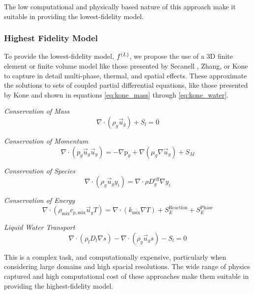 The low computational and physically based nature of this approach make it suitable in providing the lowest-fidelity model.

\subsubsection{Highest Fidelity Model}

To provide the lowest-fidelity model, $f^{(L)}$, we propose the use of a 3D finite element or finite volume model like those presented by Secanell \etal, Zhang, or Kone \etal \cite{secanellOpenFCSTOpenSourceMathematical2014, zhangOpenFuelCell2NewComputational2024, koneOpenSourceToolboxPEM2018} to capture in detail multi-phase, thermal, and spatial effects. These approximate the solutions to sets of coupled partial differential equations, like those presented by Kone \etal and shown in equations \ref{eq:kone_mass} through \ref{eq:kone_water}.

\textit{Conservation of Mass}
\begin{equation}
	\nabla \cdot (\rho_g \vec{u}_g) + S_l = 0 \label{eq:kone_mass}
\end{equation}

\textit{Conservation of Momentum}
\begin{equation}
	\nabla \cdot (p_g \vec{u}_g \vec{u}_g) = -\nabla \text{p}_g + \nabla (\mu_g \nabla \vec{u}_g) + S_M
\end{equation}

\textit{Conservation of Species}
\begin{equation}
	\nabla \cdot (\rho_g \vec{u}_g y_i) = \nabla \cdot \rho D^{\text{eff}}_g \nabla y_i
\end{equation}

\textit{Conservation of Energy}
\begin{equation}
	\nabla \cdot (\rho_\text{mix} c_{p, \text{mix}} \vec{u}_g T) = \nabla \cdot (k_\text{mix} \nabla T) + S_E^{\text{Reaction}} + S_E^{\text{Phase}}
\end{equation}

\textit{Liquid Water Transport}
\begin{equation}
	\nabla \cdot (\rho_l D_l \nabla s) - \nabla \cdot (\rho_g \vec{u}_g s) - S_l = 0 \label{eq:kone_water}
\end{equation}

This is a complex task, and computationally expensive, particularly when considering large domains and high spacial resolutions.
The wide range of physics captured and high computational cost of these approaches make them suitable in providing the highest-fidelity model.

